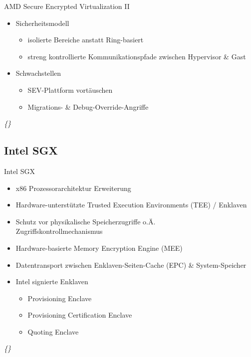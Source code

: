 \documentclass{sdqbeamer}
\begin{document}
\begin{frame}{AMD Secure Encrypted Virtualization II}
	\begin{itemize}
		\item Sicherheitsmodell
		\begin{itemize}
			\item isolierte Bereiche anstatt Ring-basiert
			\item streng kontrollierte Kommunikationspfade zwischen Hypervisor \& Gast
		\end{itemize}
		\item Schwachstellen
		\begin{itemize}
			\item SEV-Plattform vortäuschen
			\item Migrations- \& Debug-Override-Angriffe
		\end{itemize}
	\end{itemize}
	\vfill
	\textit{\{\cite{kaplan, buhren}\}}
\end{frame}

\subsection{Intel SGX}
\begin{frame}{Intel SGX}
	\begin{itemize}
		\item x86 Prozessorarchitektur Erweiterung
		\item Hardware-unterstützte Trusted Execution Environments (TEE) / Enklaven
		\item Schutz vor physikalische Speicherzugriffe o.Ä.\\
			Zugriffskontrollmechanismus
		\item Hardware-basierte Memory Encryption Engine (MEE)
		\item Datentransport zwischen Enklaven-Seiten-Cache (EPC) \& System-Speicher
		\item Intel signierte Enklaven
		\begin{itemize}
			\item Provisioning Enclave
			\item Provisioning Certification Enclave
			\item Quoting Enclave
		\end{itemize}
	\end{itemize}
	\vfill
	\textit{\{\cite{costan, knauth, mofrad, swami}\}}
\end{frame}
\end{document}
